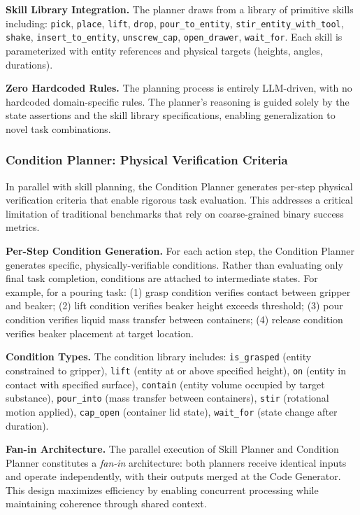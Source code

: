 \documentclass[letterpaper]{article} %
\begin{document}
\textbf{Skill Library Integration.} The planner draws from a library of primitive skills including: \texttt{pick}, \texttt{place}, \texttt{lift}, \texttt{drop}, \texttt{pour\_to\_entity}, \texttt{stir\_entity\_with\_tool}, \texttt{shake}, \texttt{insert\_to\_entity}, \texttt{unscrew\_cap}, \texttt{open\_drawer}, \texttt{wait\_for}. Each skill is parameterized with entity references and physical targets (heights, angles, durations).

\textbf{Zero Hardcoded Rules.} The planning process is entirely LLM-driven, with no hardcoded domain-specific rules. The planner's reasoning is guided solely by the state assertions and the skill library specifications, enabling generalization to novel task combinations.

\subsubsection{Condition Planner: Physical Verification Criteria}

In parallel with skill planning, the Condition Planner generates per-step physical verification criteria that enable rigorous task evaluation. This addresses a critical limitation of traditional benchmarks that rely on coarse-grained binary success metrics.

\textbf{Per-Step Condition Generation.} For each action step, the Condition Planner generates specific, physically-verifiable conditions. Rather than evaluating only final task completion, conditions are attached to intermediate states. For example, for a pouring task: (1) grasp condition verifies contact between gripper and beaker; (2) lift condition verifies beaker height exceeds threshold; (3) pour condition verifies liquid mass transfer between containers; (4) release condition verifies beaker placement at target location.

\textbf{Condition Types.} The condition library includes: \texttt{is\_grasped} (entity constrained to gripper), \texttt{lift} (entity at or above specified height), \texttt{on} (entity in contact with specified surface), \texttt{contain} (entity volume occupied by target substance), \texttt{pour\_into} (mass transfer between containers), \texttt{stir} (rotational motion applied), \texttt{cap\_open} (container lid state), \texttt{wait\_for} (state change after duration).

\textbf{Fan-in Architecture.} The parallel execution of Skill Planner and Condition Planner constitutes a \textit{fan-in} architecture: both planners receive identical inputs and operate independently, with their outputs merged at the Code Generator. This design maximizes efficiency by enabling concurrent processing while maintaining coherence through shared context.
\end{document}
